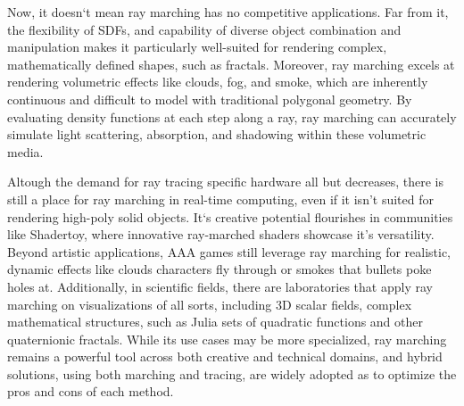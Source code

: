 Now, it doesn`t mean ray marching has no competitive applications. Far from it, the flexibility of SDFs, and capability of diverse object combination and manipulation makes it particularly well-suited for rendering complex, mathematically defined shapes, such as fractals. Moreover, ray marching excels at rendering volumetric effects like clouds, fog, and smoke, which are inherently continuous and difficult to model with traditional polygonal geometry. By evaluating density functions at each step along a ray, ray marching can accurately simulate light scattering, absorption, and shadowing within these volumetric media.

Altough the demand for ray tracing specific hardware all but decreases, there is still a place for ray marching in real-time computing, even if it isn’t suited for rendering high-poly solid objects. It`s creative potential flourishes in communities like Shadertoy, where innovative ray-marched shaders showcase it's versatility. Beyond artistic applications, AAA games still leverage ray marching for realistic, dynamic effects like clouds characters fly through or smokes that bullets poke holes at. Additionally, in scientific fields, there are laboratories that apply ray marching on visualizations of all sorts, including 3D scalar fields, complex mathematical structures, such as Julia sets of quadratic functions and other quaternionic fractals. While its use cases may be more specialized, ray marching remains a powerful tool across both creative and technical domains, and hybrid solutions, using both marching and tracing, are widely adopted as to optimize the pros and cons of each method.











